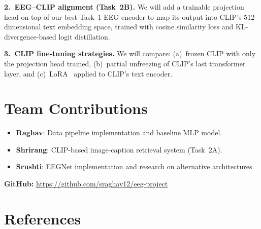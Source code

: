 \documentclass{article}
\begin{document}
\textbf{2.\ EEG--CLIP alignment (Task~2B).}
We will add a trainable projection head on top of our best Task~1 EEG encoder to map its output into CLIP's 512-dimensional text embedding space, trained with cosine similarity loss and KL-divergence-based logit distillation.

\textbf{3.\ CLIP fine-tuning strategies.}
We will compare: (a)~frozen CLIP with only the projection head trained, (b)~partial unfreezing of CLIP's last transformer layer, and (c)~LoRA~\cite{hu2021lora} applied to CLIP's text encoder.

\section{Team Contributions}
\label{sec:contributions}

\begin{itemize}
    \item \textbf{Raghav}: Data pipeline implementation and baseline MLP model.
    \item \textbf{Shrirang}: CLIP-based image-caption retrieval system (Task~2A).
    \item \textbf{Srushti}: EEGNet implementation and research on alternative architectures.
\end{itemize}

\textbf{GitHub:} \url{https://github.com/sraghav12/eeg-project}

\section*{References}

\small
\end{document}
